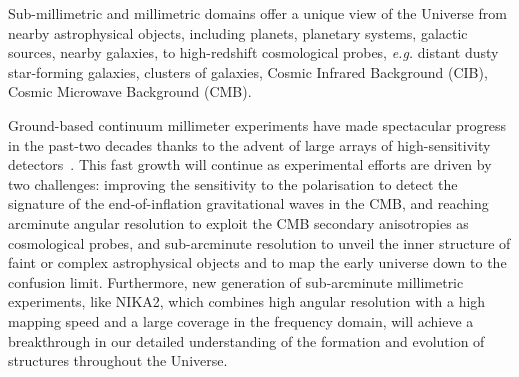 %

Sub-millimetric and millimetric domains offer a unique view of the
Universe from nearby astrophysical objects, including planets,
planetary systems, galactic sources, nearby galaxies, to high-redshift
cosmological probes, \emph{e.g.} distant dusty star-forming galaxies,
clusters of galaxies, Cosmic Infrared Background (CIB), Cosmic Microwave
Background (CMB).

Ground-based {\lp continuum} millimeter experiments have made spectacular progress in
the past-two decades thanks to the advent of large arrays of
high-sensitivity detectors~\citep{Wilson2008_AZTEC,
  Siringo2009_LABOCA, Swetz2011_ACT, Bleem2012_SPT, Monfardini2011_NIKA, Holland2013_SCUBA2,
  Dicker2014_MUSTANG2, Adam2017}. %
This fast growth will continue as experimental efforts are
driven by two challenges: improving the sensitivity to the
polarisation to detect the signature of
the end-of-inflation gravitational waves in the CMB, and reaching
arcminute angular resolution to exploit the CMB secondary anisotropies
as cosmological probes, and sub-arcminute resolution to unveil the
inner structure of faint or complex astrophysical objects and to map
the early universe down to the confusion limit. Furthermore, new
generation of sub-arcminute millimetric experiments, like NIKA2, which
combines high angular resolution with a high mapping speed and a large
coverage in the frequency domain, will achieve a breakthrough in 
our detailed understanding of the formation and evolution of
structures throughout the Universe.

